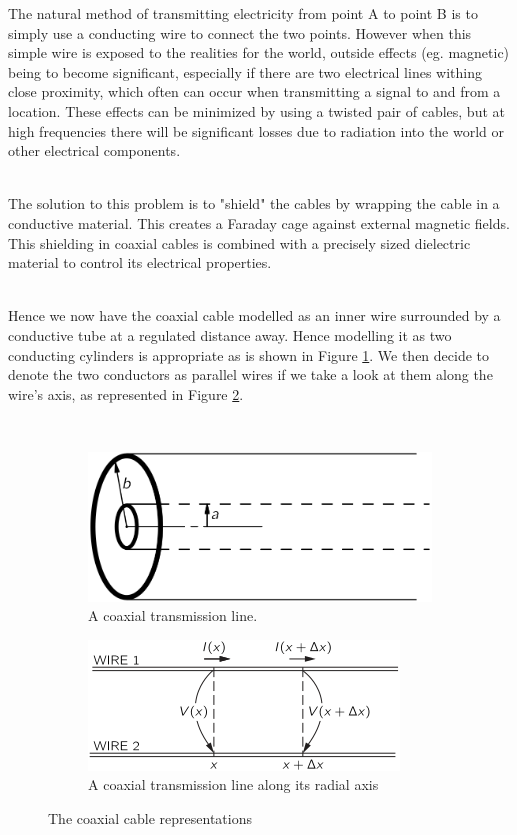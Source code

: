 The natural method of transmitting electricity from point A to point B is to simply use a conducting wire to connect the two points. However when this simple wire is exposed to the realities for the world, outside effects (eg. magnetic) being to become significant, especially if there are two electrical lines withing close proximity, which often can occur when transmitting a signal to and from a location. These effects can be minimized by using a twisted pair of cables, but at high frequencies there will be significant losses due to radiation into the world or other electrical components. \cite{feynman}

\\
The solution to this problem is to "shield" the cables by wrapping the cable in a conductive material. This creates a Faraday cage against external magnetic fields. This shielding in coaxial cables is combined with a precisely sized dielectric material to control its electrical properties.

\\
Hence we now have the coaxial cable modelled as an inner wire surrounded by a conductive tube at a regulated distance away. Hence modelling it as two conducting cylinders is appropriate as is shown in Figure \ref{fig:coax_theory_1}. We then decide to denote the two conductors as parallel wires if we take a look at them along the wire's axis, as represented in Figure \ref{fig:coax_theory_2}. 

\\
\begin{figure}[h]
\centering
\begin{subfigure}{.5\textwidth}
  \centering
  \includegraphics[width=.666\linewidth]{figures/coaxial_derivation_1.png}
  \caption{A coaxial transmission line. \cite{feynman}}
  \label{fig:coax_theory_1}
\end{subfigure}%
\begin{subfigure}{.5\textwidth}
  \centering
  \includegraphics[width=.75\linewidth]{figures/coaxial_derivation_2.png}
  \caption{A coaxial transmission line along its radial axis \cite{feynman}}
  \label{fig:coax_theory_2}
\end{subfigure}
\caption{The coaxial cable representations}
\label{fig:test}
\end{figure}


